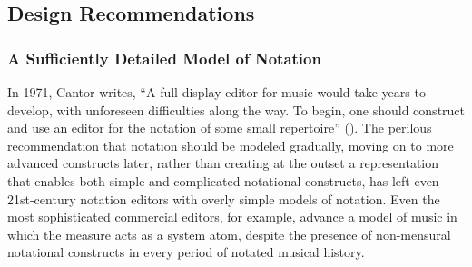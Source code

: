 \subsection{Design Recommendations}

\subsubsection{A Sufficiently Detailed Model of Notation}
In 1971, Cantor writes, ``A full display editor for music would take years to develop, with unforeseen difficulties along the way. To begin, one should construct and use an editor for the notation of some small repertoire'' (\cite[107]{cantor1971computer}). The perilous recommendation that notation should be modeled gradually, moving on to more advanced constructs later, rather than creating at the outset a representation that enables both simple and complicated notational constructs, has left even 21st-century notation editors with overly simple models of notation. Even the most sophisticated commercial editors, for example, advance a model of music in which the measure acts as a system atom, despite the presence of non-mensural notational constructs in every period of notated musical history. 

